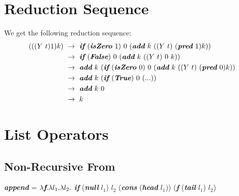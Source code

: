 \documentclass{report}
\begin{document}
	\section{Reduction Sequence}
	\startsection
		We get the following reduction sequence:
		\begin{align*}
			((( Y  \ t) 1 ) k) \ & \rightarrow \ \textit{\textbf{if} } (\textit{\textbf{isZero} } 1) \ 0 \ (\textit{\textbf{add} } k \ ((Y \ t) \ (\textit{\textbf{pred} } 1)k)) \\
			& \rightarrow \ \textit{\textbf{if} } (\textit{\textbf{False}}) \ 0 \ (\textit{\textbf{add} } k \ ((Y \ t) \ 0 \ k)) \\
			& \rightarrow \ \textit{\textbf{add} } k \ (\textit{\textbf{if} } (\textit{\textbf{isZero} } 0) \ 0 \ (\textit{\textbf{add} } k \ ((Y \ t) \ (\textit{\textbf{pred} } 0)k)) \\
			& \rightarrow \ \textit{\textbf{add} } k \ (\textit{\textbf{if} } (\textit{\textbf{True}}) \ 0 \ (...)) \\
			& \rightarrow \ \textit{\textbf{add} } k \ 0 \\
			& \rightarrow \ k
		\end{align*}
	\closesection
	
	\section{List Operators}
	\startsection
		\subsection{Non-Recursive From}
		\startsubsection
			\textit{\textbf{append}} = $\lambda \textit{\textbf{f}}. \lambda l_1.\lambda l_2.$ \textit{\textbf{if}} (\textit{\textbf{null}} $l_1$) $l_2$ (\textit{\textbf{cons}} (\textit{\textbf{head}} $l_1$)) (\textit{\textbf{f}} (\textit{\textbf{tail}} $l_1$) $l_2$)
		\closesection
\end{document}
